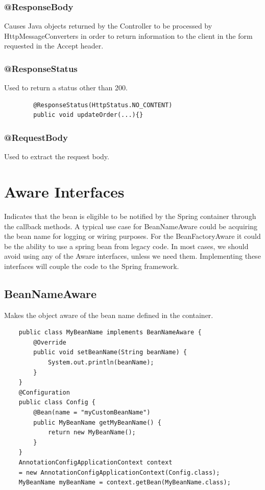 \documentclass{scrartcl}
\begin{document}
\subsubsection{@ResponseBody}

Causes Java objects returned by the Controller to be processed by HttpMessageConverters in order to return information to the client in the form requested in the Accept header.

\subsubsection{@ResponseStatus}

    Used to return a status other than 200.

    \begin{lstlisting}
        @ResponseStatus(HttpStatus.NO_CONTENT)
        public void updateOrder(...){}
    \end{lstlisting}

\subsubsection{@RequestBody}

    Used to extract the request body.

\section{Aware Interfaces}

    Indicates that the bean is eligible to be notified by the Spring container through the callback methods.
    A typical use case for BeanNameAware could be acquiring the bean name for logging or wiring purposes. For the BeanFactoryAware it could be the ability to use a spring bean from legacy code.
    In most cases, we should avoid using any of the Aware interfaces, unless we need them. Implementing these interfaces will couple the code to the Spring framework.

\subsection{BeanNameAware}

    Makes the object aware of the bean name defined in the container.

\begin{lstlisting}
    public class MyBeanName implements BeanNameAware {
        @Override
        public void setBeanName(String beanName) {
            System.out.println(beanName);
        }
    }
    @Configuration
    public class Config {
        @Bean(name = "myCustomBeanName")
        public MyBeanName getMyBeanName() {
            return new MyBeanName();
        }
    }
    AnnotationConfigApplicationContext context
    = new AnnotationConfigApplicationContext(Config.class);
    MyBeanName myBeanName = context.getBean(MyBeanName.class);

\end{lstlisting}
\end{document}
